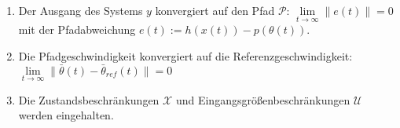    
    \begin{enumerate}
        \item Der Ausgang des Systems $y$ konvergiert auf den Pfad $\mathcal{P}$: $\lim \limits_{t \to \infty} \|e(t)\| = 0$ mit der Pfadabweichung $e(t) := h(x(t)) - p(\theta(t))$.
        \item Die Pfadgeschwindigkeit konvergiert auf die Referenzgeschwindigkeit: $\lim \limits_{t \to \infty} \|\bar{\theta}(t)-\bar{\theta}_{ref}(t)\| = 0$
        \item Die Zustandsbeschränkungen $\mathcal{X}$ und Eingangsgrößenbeschränkungen $\mathcal{U}$ werden eingehalten.
    \end{enumerate} 



